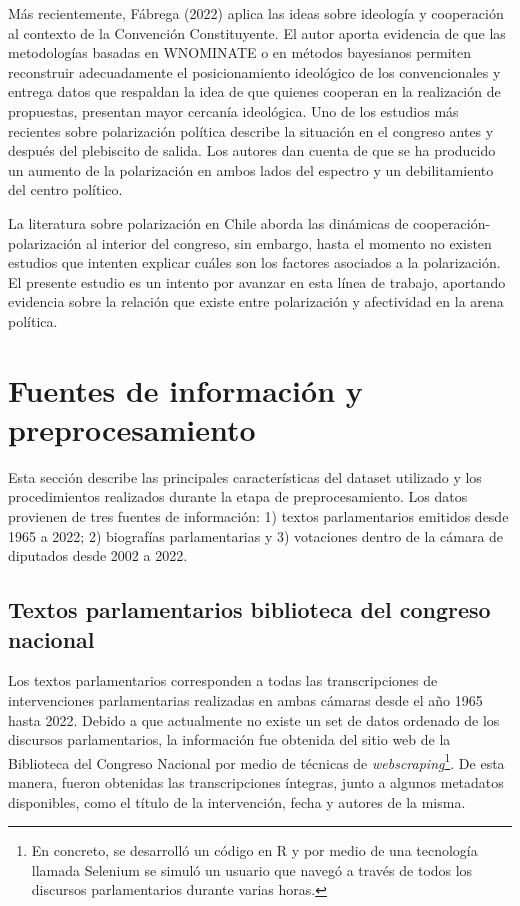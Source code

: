 \documentclass[
  12pt,
]{article}
\begin{document}
Más recientemente, Fábrega (2022) aplica las ideas sobre ideología y
cooperación al contexto de la Convención Constituyente. El autor aporta
evidencia de que las metodologías basadas en WNOMINATE o en métodos
bayesianos permiten reconstruir adecuadamente el posicionamiento
ideológico de los convencionales y entrega datos que respaldan la idea
de que quienes cooperan en la realización de propuestas, presentan mayor
cercanía ideológica. Uno de los estudios más recientes sobre
polarización política describe la situación en el congreso antes y
después del plebiscito de salida. Los autores dan cuenta de que se ha
producido un aumento de la polarización en ambos lados del espectro y un
debilitamiento del centro político.

La literatura sobre polarización en Chile aborda las dinámicas de
cooperación-polarización al interior del congreso, sin embargo, hasta el
momento no existen estudios que intenten explicar cuáles son los
factores asociados a la polarización. El presente estudio es un intento
por avanzar en esta línea de trabajo, aportando evidencia sobre la
relación que existe entre polarización y afectividad en la arena
política.

\pagebreak

\hypertarget{fuentes-de-informaciuxf3n-y-preprocesamiento}{%
\section{Fuentes de información y
preprocesamiento}\label{fuentes-de-informaciuxf3n-y-preprocesamiento}}

Esta sección describe las principales características del dataset
utilizado y los procedimientos realizados durante la etapa de
preprocesamiento. Los datos provienen de tres fuentes de información: 1)
textos parlamentarios emitidos desde 1965 a 2022; 2) biografías
parlamentarias y 3) votaciones dentro de la cámara de diputados desde
2002 a 2022.

\hypertarget{textos-parlamentarios-biblioteca-del-congreso-nacional}{%
\subsection{Textos parlamentarios biblioteca del congreso
nacional}\label{textos-parlamentarios-biblioteca-del-congreso-nacional}}

Los textos parlamentarios corresponden a todas las transcripciones de
intervenciones parlamentarias realizadas en ambas cámaras desde el año
1965 hasta 2022. Debido a que actualmente no existe un set de datos
ordenado de los discursos parlamentarios, la información fue obtenida
del sitio web de la Biblioteca del Congreso Nacional por medio de
técnicas de
\emph{webscraping}\footnote{En concreto, se desarrolló un código en R y por medio de una tecnología llamada Selenium se simuló un usuario que navegó a través de todos los discursos parlamentarios durante varias horas.}.
De esta manera, fueron obtenidas las transcripciones íntegras, junto a
algunos metadatos disponibles, como el título de la intervención, fecha
y autores de la misma.
\end{document}
